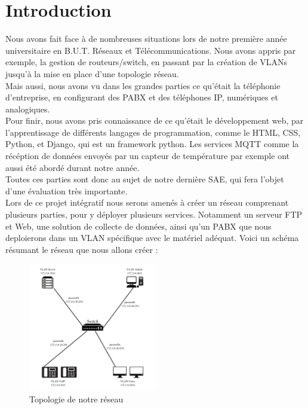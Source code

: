 \documentclass[12pt, a4paper]{article}
\begin{document}
\section{Introduction}
Nous avons fait face à de nombreuses situations lors de notre première année
universitaire en B.U.T. Réseaux et Télécommunications. Nous avons appris 
par exemple, la gestion de routeurs/switch, en passant par la création de 
VLANs jusqu'à la mise en place d'une topologie réseau.\\ 
Mais aussi, nous avons vu dans les grandes parties ce qu'était la téléphonie
d'entreprise, en configurant des PABX et des téléphones IP, numériques et
analogiques.\\
Pour finir, nous avons pris connaissance de ce qu'était le développement 
web, par l'apprentissage de différents langages de programmation, comme
le HTML, CSS, Python, et Django, qui est un framework python. Les services
MQTT comme la récéption de données envoyés par un capteur de température 
par exemple ont aussi été abordé durant notre année.\\

Toutes ces parties sont donc au sujet de notre dernière SAE, qui fera l'objet
d'une évaluation très importante.\\

Lors de ce projet intégratif nous serons amenés à créer un réseau comprenant
plusieurs parties, pour y déployer plusieurs services. Notamment un serveur 
FTP et Web, une solution de collecte de données, ainsi qu'un PABX
que nous deploierons dans un VLAN spécifique avec le matériel adéquat.
Voici un schéma résumant le réseau que nous allons créer :
\begin{figure}[H]
    \centering
    \includegraphics[width=0.5\textwidth]{../img/topologie.png}
    \caption{Topologie de notre réseau}
    \label{fig:topologie}
\end{figure}
\end{document}
